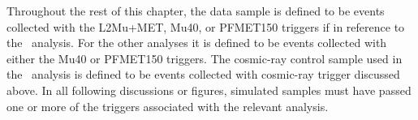 Throughout the rest of this chapter, the data sample is defined to be events collected with the L2Mu+MET, Mu40, or PFMET150 triggers if in reference to the \muononly\ analysis.
For the other analyses it is defined to be events collected with either the Mu40 or PFMET150 triggers. The cosmic-ray control sample used in the \muononly\ analysis
is defined to be events collected with cosmic-ray trigger discussed above. In all following discussions or figures, simulated samples must have passed one 
or more of the triggers associated with the relevant analysis.